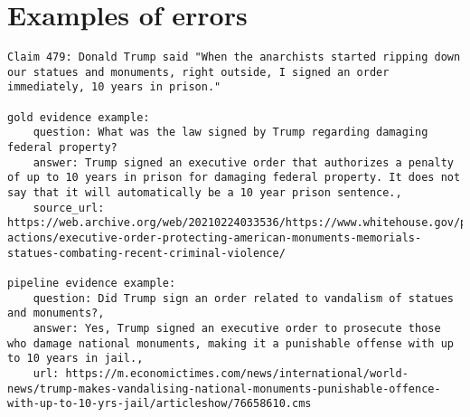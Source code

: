 
\section{Examples of errors}
\label{appendix_sec:errors}

\begin{lstlisting}[caption={Example of a claim where our pipeline uses newspaper sources instead of official government sources.}, label={lst:gov_error}, breaklines=true, breakatwhitespace=false, columns=fullflexible]
Claim 479: Donald Trump said "When the anarchists started ripping down our statues and monuments, right outside, I signed an order immediately, 10 years in prison."

gold evidence example: 
    question: What was the law signed by Trump regarding damaging federal property?
    answer: Trump signed an executive order that authorizes a penalty of up to 10 years in prison for damaging federal property. It does not say that it will automatically be a 10 year prison sentence.,
    source_url: https://web.archive.org/web/20210224033536/https://www.whitehouse.gov/presidential-actions/executive-order-protecting-american-monuments-memorials-statues-combating-recent-criminal-violence/

pipeline evidence example: 
    question: Did Trump sign an order related to vandalism of statues and monuments?, 
    answer: Yes, Trump signed an executive order to prosecute those who damage national monuments, making it a punishable offense with up to 10 years in jail.,
    url: https://m.economictimes.com/news/international/world-news/trump-makes-vandalising-national-monuments-punishable-offence-with-up-to-10-yrs-jail/articleshow/76658610.cms
    
\end{lstlisting}


